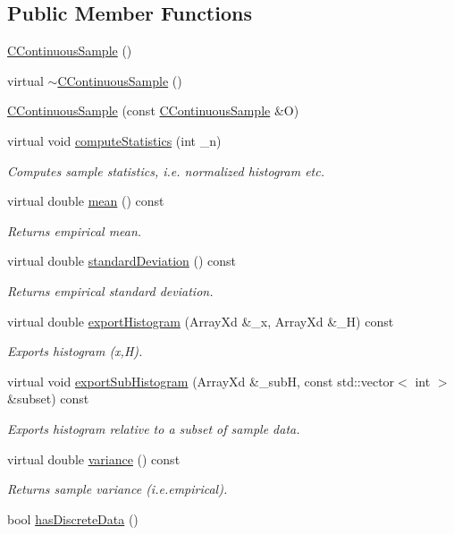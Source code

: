 \subsection*{Public Member Functions}
\begin{DoxyCompactItemize}
\item 
\hyperlink{class_c_continuous_sample_ada43d66e4e4e38cfa8c82e55d618a614}{C\-Continuous\-Sample} ()
\item 
virtual \hyperlink{class_c_continuous_sample_af7732d71f3a91df8941993dc22f62d0a}{$\sim$\-C\-Continuous\-Sample} ()
\item 
\hyperlink{class_c_continuous_sample_aaefe6f714c1f0b6907ae3c443fff34b0}{C\-Continuous\-Sample} (const \hyperlink{class_c_continuous_sample}{C\-Continuous\-Sample} \&O)
\item 
virtual void \hyperlink{class_c_continuous_sample_aed08dc4372c437b9a6168399f583d863}{compute\-Statistics} (int \-\_\-n)
\begin{DoxyCompactList}\small\item\em Computes sample statistics, i.\-e. normalized histogram etc. \end{DoxyCompactList}\item 
virtual double \hyperlink{class_c_continuous_sample_a30e72f44dbb7c2ca3c6b8f77ff53688a}{mean} () const 
\begin{DoxyCompactList}\small\item\em Returns empirical mean. \end{DoxyCompactList}\item 
virtual double \hyperlink{class_c_continuous_sample_a676e1bdea044e64b6c096fd58d056116}{standard\-Deviation} () const 
\begin{DoxyCompactList}\small\item\em Returns empirical standard deviation. \end{DoxyCompactList}\item 
virtual double \hyperlink{class_c_continuous_sample_ad2011a526a7e7c156bdf7a9cccf48277}{export\-Histogram} (Array\-Xd \&\-\_\-x, Array\-Xd \&\-\_\-\-H) const 
\begin{DoxyCompactList}\small\item\em Exports histogram (x,H). \end{DoxyCompactList}\item 
virtual void \hyperlink{class_c_continuous_sample_aa3ea500b67bc9fdb767c7c324975a2eb}{export\-Sub\-Histogram} (Array\-Xd \&\-\_\-sub\-H, const std\-::vector$<$ int $>$ \&subset) const 
\begin{DoxyCompactList}\small\item\em Exports histogram relative to a subset of sample data. \end{DoxyCompactList}\item 
virtual double \hyperlink{class_c_continuous_sample_a79881662a2bcb842c97b418487d57eed}{variance} () const 
\begin{DoxyCompactList}\small\item\em Returns sample variance (i.\-e.\-empirical). \end{DoxyCompactList}\item 
bool \hyperlink{class_c_continuous_sample_a61a67310dfc13d836a845ec59cddd38e}{has\-Discrete\-Data} ()
\end{DoxyCompactItemize}
